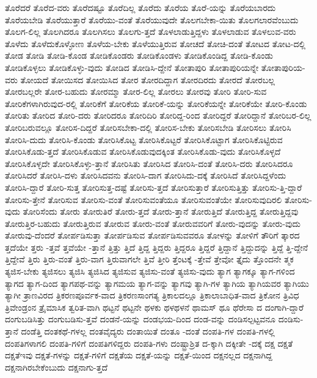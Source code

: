 {ತೊರೆದರೆ
ತೊರೆದ-ವರು
ತೊರೆದಷ್ಟೂ
ತೊರೆದಿಲ್ಲ
ತೊರೆದು
ತೊರೆಯ
ತೊರೆ-ಯನ್ನು
ತೊರೆಯಬಾರದು
ತೊರೆಯಬೇಡಿ
ತೊರೆಯುತ್ತಾರೆ
ತೊರೆಯು-ವಂತೆ
ತೊರೆಯುವುದೇ
ತೊಲಗಬೇಕಾ-ಯಿತು
ತೊಲಗಲಾರವೆಂಬುದು
ತೊಲಗ-ಲಿಲ್ಲ
ತೊಲಗಿದರೂ
ತೊಲಗಿಸಲು
ತೊಲಗು-ತ್ತದೆ
ತೊಳಲಾಡುತ್ತಿದ್ದಳು
ತೊಳಲಾಡುವ
ತೊಳಲುವ-ವರು
ತೊಳೆದು
ತೊಳೆದುಕೊಳ್ಳೋಣ
ತೊಳೆಯ-ಬೇಕು
ತೊಳೆಯುತ್ತಿರುವ
ತೋಚದೆ
ತೋಚಿ-ದಂತೆ
ತೋಟದ
ತೋಟ-ದಲ್ಲಿ
ತೋಡ
ತೋಡಿ
ತೋಡಿ-ಕೊಂಡ
ತೋಡಿಕೊಂಡರು
ತೋಡಿಕೊಂಡಳು
ತೋಡಿಕೊಂಡಿದ್ದ
ತೋಡಿ-ಕೊಂಡು
ತೋಡಿಕೊಳ್ಳಲು
ತೋಡಿಕೊಳ್ಳು-ವುದು
ತೋಡಿದ
ತೋಡಿಸಿ-ದ್ದೇನೆ
ತೋತಾಪುರಿ
ತೋತಾಪುರಿಯನ್ನೇ
ತೋತಾಪುರಿಯ-ವರು
ತೋಯದೆ
ತೋಯಿಸದ
ತೋಯಿಸಿದ
ತೋರ
ತೋರದಿದ್ದಾಗ
ತೋರದಿರದು
ತೋರದೆ
ತೋರಬಲ್ಲ
ತೋರಬಲ್ಲರೇ
ತೋರ-ಬಹುದು
ತೋರಮ್ಮಾ
ತೋರ-ಲಿಲ್ಲ
ತೋರಲು
ತೋರವು
ತೋರಿ
ತೋರಿ-ಸುವ
ತೋರಿಕೆಗಳಾಗಿರುವುದ-ರಲ್ಲಿ
ತೋರಿಕೆಗೆ
ತೋರಿಕೆಯ
ತೋರಿಕೆ-ಯನ್ನು
ತೋರಿಕೆಯನ್ನೇ
ತೋರಿಕೆಯೇ
ತೋರಿ-ಕೊಂಡು
ತೋರಿತು
ತೋರಿದ
ತೋರಿ-ದರು
ತೋರಿದರೂ
ತೋರಿದಿರಿ
ತೋರಿದ್ದ-ರಿಂದ
ತೋರಿದ್ದರೆ
ತೋರಿದ್ದಾನೆ
ತೋರಿಬರ-ಲಿಲ್ಲ
ತೋರಿಬರುವಲ್ಲೂ
ತೋರಿಸ-ದಿದ್ದರೆ
ತೋರಿಸಬೇಕಾ-ದಲ್ಲಿ
ತೋರಿಸ-ಬೇಕು
ತೋರಿಸಬೇಡಿ
ತೋರಿಸಲು
ತೋರಿಸಿ
ತೋರಿಸಿ-ದುದು
ತೋರಿಸಿ-ಕೊಂಡು
ತೋರಿಸಿಕೊಟ್ಟ
ತೋರಿಸಿಕೊಟ್ಟರೆ
ತೋರಿಸಿಕೊಟ್ಟಾಗ
ತೋರಿಸಿಕೊಟ್ಟಿರುವ
ತೋರಿಸಿಕೊಡು-ತ್ತದೆ
ತೋರಿಸಿಕೊಡುವ
ತೋರಿಸಿಕೊಡುವುದಕ್ಕಿಂತ
ತೋರಿಸಿಕೊಡು-ವುದು
ತೋರಿಸಿಕೊಳ್ಳದೆ
ತೋರಿಸಿಕೊಳ್ಳದೇ
ತೋರಿಸಿಕೊಳ್ಳು-ತ್ತಾನೆ
ತೋರಿಸಿತು
ತೋರಿಸಿದ
ತೋರಿಸಿ-ದಂತೆ
ತೋರಿಸಿ-ದರು
ತೋರಿಸಿದರೂ
ತೋರಿಸಿದರೆ
ತೋರಿಸಿ-ದಳು
ತೋರಿಸಿದವನು
ತೋರಿಸಿ-ದಾಗ
ತೋರಿಸಿದು-ದಕ್ಕೆ
ತೋರಿಸಿದೆ
ತೋರಿಸಿದ್ದಳೆಂದು
ತೋರಿಸಿ-ದ್ದಾರೆ
ತೋರಿ-ಸುತ್ತ
ತೋರಿಸುತ್ತ-ದಷ್ಟೆ
ತೋರಿಸು-ತ್ತದೆ
ತೋರಿಸುತ್ತಾರೆ
ತೋರಿಸುತ್ತಿತ್ತು
ತೋರಿಸು-ತ್ತಿ-ದ್ದಾರೆ
ತೋರಿಸು-ತ್ತೇನೆ
ತೋರಿಸುವ
ತೋರಿಸು-ವಂತೆ
ತೋರಿಸುವಂತೆಯೂ
ತೋರಿಸುವಂತೆಯೇ
ತೋರಿಸುವುದಿರಲಿ
ತೋರಿಸು-ವುದು
ತೋರಿಸೆಂದು
ತೋರು
ತೋರುತಿರೆ
ತೋರು-ತ್ತದೆ
ತೋರು-ತ್ತಾನೆ
ತೋರುತ್ತಿದೆ
ತೋರುತ್ತಿದ್ದ
ತೋರುತ್ತಿದ್ದವು
ತೋರುತ್ತಿರ-ಬಹುದು
ತೋರುತ್ತಿರುವ
ತೋರುವ
ತೋರು-ವಂತೆ
ತೋರುವವರಿಗೆ
ತೋರು-ವುದನ್ನು
ತೋರು-ವುದು
ತೋರುವು-ದೆಂದರೆ
ತೋರ್ಪಡಿಸುತ್ತಾ
ತೋರ್ಪಡಿಸುವ
ತೋರ್ಪಡಿಸುವವರೂ
ತೋಳನ್ನು
ತೋಳಿಗೆ
ತೌರಿಗೆ
ತ್ಕಾರದ
ತ್ತದೆಯೇ
ತ್ತರು
-ತ್ತವೆ
ತ್ತವೆಯೇ
-ತ್ತಾನೆ
ತ್ತಿತ್ತು
ತ್ತಿದೆ
ತ್ತಿದ್ದ
ತ್ತಿದ್ದರು
ತ್ತಿದ್ದರೂ
ತ್ತಿದ್ದರೆ
ತ್ತಿದ್ದಾನೆ
ತ್ತಿದ್ದುದನ್ನು
ತ್ತಿದ್ದೆ
ತ್ತಿ-ದ್ದೇನೆ
ತ್ತಿದ್ದೇವೆ
ತ್ತಿರು
ತ್ತಿರು-ವಂತೆ
ತ್ತಿರು-ವಾಗ
ತ್ತಿರುವಾಗಲೇ
ತ್ತಿವೆ
ತ್ತೀರಿ
ತ್ತೆಂಟಕ್ಕೆ
-ತ್ತೇವೆ
ತ್ತೇವೋ
ತ್ತೈದು
ತ್ತೊಂದನೇ
ತ್ಮಕ
ತ್ಯಜಿಸ-ಬೇಕು
ತ್ಯಜಿಸಲು
ತ್ಯಜಿಸಿ
ತ್ಯಜಿಸಿದ
ತ್ಯಜಿಸುವ
ತ್ಯಜಿಸು-ವಂತೆ
ತ್ಯಜಿಸು-ವುದು
ತ್ಯಾಗ
ತ್ಯಾಗಕ್ಕೂ
ತ್ಯಾಗ-ಗಳಿಂದ
ತ್ಯಾಗದ
ತ್ಯಾಗ-ದಿಂದ
ತ್ಯಾಗಪಥ-ವನ್ನು
ತ್ಯಾಗಮಯ
ತ್ಯಾಗ-ವನ್ನು
ತ್ಯಾಗವು
ತ್ಯಾಗಿ-ಗಳ
ತ್ಯಾಗಿಯ
ತ್ಯಾಗಿಯವರ
ತ್ಯಾಗಿಯು
ತ್ಯಾಗೀ
ತ್ರಾಣವಿರದ
ತ್ರಿಕರಣಪೂರ್ವಕ-ವಾದ
ತ್ರಿಕರಣಸಾಂಗತ್ಯ
ತ್ರಿಕಾಲದಲ್ಲೂ
ತ್ರಿಕಾಲಾಬಾಧಿತ-ವಾದ
ತ್ರಿಕೋನ
ತ್ರಿವಿಧ
ತ್ರಿವೇಂಡ್ರಂನ
ತ್ರೈಮಾಸಿಕ
ತ್ವರಿತ-ವಾಗಿ
ಥಟ್ಟನೆ
ಥಟ್ಟನೇ
ಥಳಕು
ಥಳಥಳನೆ
ಥಾಮಸ್
ಥೂ
ಥೆರೇಸಾ
ದ
ದಂಗಾಗಿ-ದ್ದಾರೆ
ದಂಗುಬಡಿಸಿತ್ತು
ದಂಗುಬಡಿಸು-ತ್ತವೆ
ದಂಡನೆ-ಯನ್ನು
ದಂಡಭಯ-ದಿಂದ
ದಂಡ-ವನ್ನು
ದಂಡಿಸಲ್ಪಟ್ಟವನೂ
ದಂಡಿಸು-ತ್ತಾನೆ
ದಂಡೆತ್ತಿ
ದಂತಕಥೆ-ಗಳಲ್ಲ
ದಂತವೈದ್ಯರು
ದಂತಾಯಿತೆ
ದಂತೂ
-ದಂತೆ
ದಂಪತಿ-ಗಳ
ದಂಪತಿ-ಗಳಲ್ಲಿ
ದಂಪತಿಗಳಾಗಲಿ
ದಂಪತಿ-ಗಳಿಗೆ
ದಂಪತಿಗಳಿದ್ದರು
ದಂಪತಿ-ಗಳು
ದಂಷ್ಟ್ರಾಶ್ರಿತ
ದ-ಕ್ಕಾಗಿ
ದಕ್ಕೀತೇ
-ದಕ್ಕೆ
ದಕ್ಷ
ದಕ್ಷತೆ
ದಕ್ಷತೆಇವು
ದಕ್ಷತೆ-ಗಳನ್ನು
ದಕ್ಷತೆ-ಗಳಿಗೆ
ದಕ್ಷತೆಯ
ದಕ್ಷತೆ-ಯನ್ನು
ದಕ್ಷತೆ-ಯಿಂದ
ದಕ್ಷನಲ್ಲದ
ದಕ್ಷನಾಗಿದ್ದ
ದಕ್ಷನಾಗಿರಬೇಕೆಂಬುದು
ದಕ್ಷನಾಗು-ತ್ತದೆ
}
